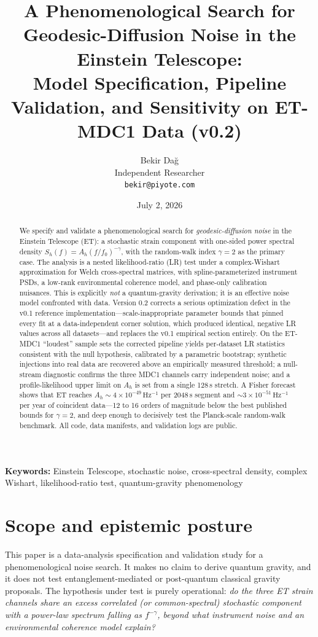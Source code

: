 \documentclass[11pt]{article}
\title{A Phenomenological Search for Geodesic-Diffusion Noise in the Einstein Telescope:\\
\large Model Specification, Pipeline Validation, and Sensitivity on ET-MDC1 Data (v0.2)}
\author{Bekir Da\u{g}\\Independent Researcher\\\texttt{bekir@piyote.com}}
\date{July 2, 2026}
\newcommand{\Ah}{A_h}
\newcommand{\Sh}{S_h}
\begin{document}
\maketitle

\begin{abstract}
We specify and validate a phenomenological search for \emph{geodesic-diffusion noise} in the Einstein Telescope (ET): a stochastic strain component with one-sided power spectral density $\Sh(f) = \Ah (f/f_0)^{-\gamma}$, with the random-walk index $\gamma = 2$ as the primary case. The analysis is a nested likelihood-ratio (LR) test under a complex-Wishart approximation for Welch cross-spectral matrices, with spline-parameterized instrument PSDs, a low-rank environmental coherence model, and phase-only calibration nuisances. This is explicitly \emph{not} a quantum-gravity derivation; it is an effective noise model confronted with data. Version 0.2 corrects a serious optimization defect in the v0.1 reference implementation---scale-inappropriate parameter bounds that pinned every fit at a data-independent corner solution, which produced identical, negative LR values across all datasets---and replaces the v0.1 empirical section entirely. On the ET-MDC1 ``loudest'' sample sets the corrected pipeline yields per-dataset LR statistics consistent with the null hypothesis, calibrated by a parametric bootstrap; synthetic injections into real data are recovered above an empirically measured threshold; a null-stream diagnostic confirms the three MDC1 channels carry independent noise; and a profile-likelihood upper limit on $\Ah$ is set from a single 128\,s stretch. A Fisher forecast shows that ET reaches $\Ah \sim 4\times10^{-49}\,\mathrm{Hz^{-1}}$ per 2048\,s segment and $\sim 3\times10^{-51}\,\mathrm{Hz^{-1}}$ per year of coincident data---12 to 16 orders of magnitude below the best published bounds for $\gamma=2$, and deep enough to decisively test the Planck-scale random-walk benchmark. All code, data manifests, and validation logs are public.
\end{abstract}

\noindent\textbf{Keywords:} Einstein Telescope, stochastic noise, cross-spectral density, complex Wishart, likelihood-ratio test, quantum-gravity phenomenology

\section{Scope and epistemic posture}
\label{sec:scope}

This paper is a data-analysis specification and validation study for a phenomenological noise search. It makes no claim to derive quantum gravity, and it does not test entanglement-mediated or post-quantum classical gravity proposals. The hypothesis under test is purely operational: \emph{do the three ET strain channels share an excess correlated (or common-spectral) stochastic component with a power-law spectrum falling as $f^{-\gamma}$, beyond what instrument noise and an environmental coherence model explain?}
\end{document}
